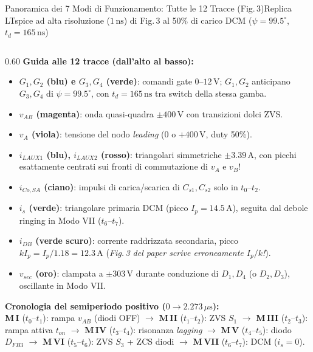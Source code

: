 \documentclass[aspectratio=169,9pt]{beamer}
\newcommand{\V}{\,\text{V}}
\newcommand{\A}{\,\text{A}}
\newcommand{\ns}{\,\text{ns}}
\newcommand{\us}{\,\mu\text{s}}
\begin{document}
\begin{frame}{Panoramica dei 7 Modi di Funzionamento: Tutte le 12 Tracce (Fig.\,3)}{Replica LTspice ad alta risoluzione ($1\ns$) di Fig.\,3 al 50\% di carico DCM ($\psi=99.5^\circ$, $t_d=165\ns$)}
\begin{columns}[T,onlytextwidth]
\begin{column}{0.60\textwidth}
      \vspace*{1.5mm}
      \textbf{\color{PrimaryBlue}Guida alle 12 tracce (dall'alto al basso):}
      \begin{itemize}\setlength{\itemsep}{1.6pt}
        \item \textbf{$G_1, G_2$ (blu) e $G_3, G_4$ (verde)}: comandi gate $0\text{--}12\V$; $G_1, G_2$ anticipano $G_3, G_4$ di $\psi = 99.5^\circ$, con $t_d = 165\ns$ tra switch della stessa gamba.
        \item \textbf{$v_{AB}$ (magenta)}: onda quasi-quadra $\pm 400\V$ con transizioni dolci ZVS.
        \item \textbf{$v_A$ (viola)}: tensione del nodo \emph{leading} ($0$ o $+400\V$, duty 50\%).
        \item \textbf{$i_{LAUX1}$ (blu), $i_{LAUX2}$ (rosso)}: triangolari simmetriche $\pm 3.39\A$, con picchi esattamente centrati sui fronti di commutazione di $v_A$ e $v_B$!
        \item \textbf{$i_{Co,SA}$ (ciano)}: impulsi di carica/scarica di $C_{s1}, C_{s2}$ solo in $t_0\text{--}t_2$.
        \item \textbf{$i_s$ (verde)}: triangolare primaria DCM (picco $I_p = 14.5\A$), seguita dal debole ringing in Modo VII ($t_6\text{--}t_7$).
        \item \textbf{$i_{DB}$ (verde scuro)}: corrente raddrizzata secondaria, picco \textbf{$k I_p = I_p/1.18 = 12.3\A$} (\emph{Fig.\,3 del paper scrive erroneamente $I_p/k$!}).
        \item \textbf{$v_{sec}$ (oro)}: clampata a $\pm 303\V$ durante conduzione di $D_1, D_4$ (o $D_2, D_3$), oscillante in Modo VII.
      \end{itemize}

      \vspace*{1.5mm}
      \begin{formulabox}
        \textbf{Cronologia del semiperiodo positivo ($0 \to 2.273\us$):}\\
        \textbf{M\,I} ($t_0\text{--}t_1$): rampa $v_{AB}$ (diodi OFF) $\to$ \textbf{M\,II} ($t_1\text{--}t_2$): ZVS $S_1$ $\to$ \textbf{M\,III} ($t_2\text{--}t_3$): rampa attiva $t_{on}$ $\to$ \textbf{M\,IV} ($t_3\text{--}t_4$): risonanza \emph{lagging} $\to$ \textbf{M\,V} ($t_4\text{--}t_5$): diodo $D_{FB3}$ $\to$ \textbf{M\,VI} ($t_5\text{--}t_6$): ZVS $S_3$ + ZCS diodi $\to$ \textbf{M\,VII} ($t_6\text{--}t_7$): DCM ($i_s=0$).
      \end{formulabox}
    \end{column}
  \end{columns}
\end{frame}
\end{document}
